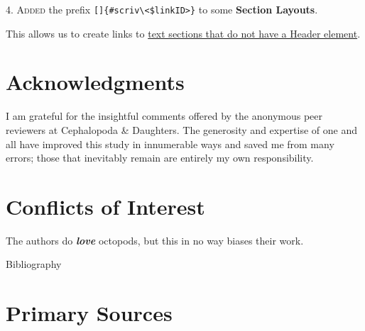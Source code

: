 \documentclass[
  12pt,
  a4paper,
  oneside]{scrbook}
\begin{document}
\textsc{4. Added} the prefix
\texttt{{[}{]}\{\#scriv\textbackslash{}\textless{}\$linkID\textgreater{}\}}
to some \textbf{Section Layouts}.

This allows us to create links to \protect\hyperlink{scriv26}{text
sections that do not have a Header element}.

\hypertarget{acknowledgments}{%
\chapter*{Acknowledgments}\label{acknowledgments}}

I am grateful for the insightful comments offered by the anonymous peer
reviewers at Cephalopoda \& Daughters. The generosity and expertise of
one and all have improved this study in innumerable ways and saved me
from many errors; those that inevitably remain are entirely my own
responsibility.

\hypertarget{conflicts-of-interest}{%
\chapter*{Conflicts of Interest}\label{conflicts-of-interest}}

The authors do \textbf{\emph{love}} octopods, but this in no way biases
their work.

Bibliography

\protect\hypertarget{scriv31}{}{}

\hypertarget{primary-sources}{%
\chapter*{Primary Sources}\label{primary-sources}}

\protect\hypertarget{scriv32}{}{}
\end{document}
